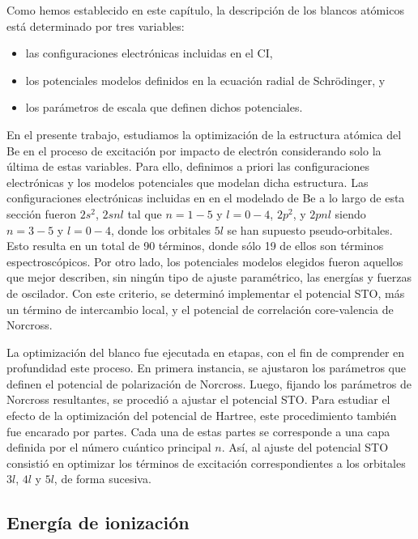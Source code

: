 Como hemos establecido en este capítulo, la descripción de los blancos 
atómicos está determinado por tres variables:
\begin{itemize}
\item las configuraciones electrónicas incluidas en el CI,
\item los potenciales modelos definidos en la ecuación radial de 
Schr\"odinger, y
\item los parámetros de escala que definen dichos potenciales.
\end{itemize}
En el presente trabajo, estudiamos la optimización de la estructura 
atómica del Be en el proceso de excitación por impacto de electrón 
considerando solo la última de estas variables. Para ello, definimos a 
priori las configuraciones electrónicas y los modelos potenciales que
modelan dicha estructura. Las configuraciones electrónicas incluidas en
en el modelado de Be a lo largo de esta sección fueron $2s^2$, $2snl$ 
tal que $n=1-5$ y $l=0-4$, $2p^2$, y $2pnl$ siendo $n=3-5$ y $l=0-4$, 
donde los orbitales $5l$ se han supuesto pseudo-orbitales. Esto resulta 
en un total de 90 términos, donde sólo 19 de ellos son términos 
espectroscópicos. %
Por otro lado, los potenciales modelos elegidos fueron aquellos que mejor 
describen, sin ningún tipo de ajuste paramétrico, las energías y fuerzas 
de oscilador. Con este criterio, se determinó implementar el potencial 
STO, más un término de intercambio local, y el potencial de correlación 
core-valencia de Norcross.

La optimización del blanco fue ejecutada en etapas, con el fin de 
comprender en profundidad este proceso. En primera instancia, se 
ajustaron los parámetros que definen el potencial de polarización de 
Norcross. Luego, fijando los parámetros de Norcross resultantes, se 
procedió a ajustar el potencial STO. Para estudiar el efecto de la 
optimización del potencial de Hartree, este procedimiento también fue 
encarado por partes. Cada una de estas partes se corresponde a una capa
definida por el número cuántico principal $n$. Así, al ajuste del 
potencial STO consistió en optimizar los términos de excitación 
correspondientes a los orbitales $3l$, $4l$ y $5l$, de forma sucesiva.

\subsection{Energía de ionización}

